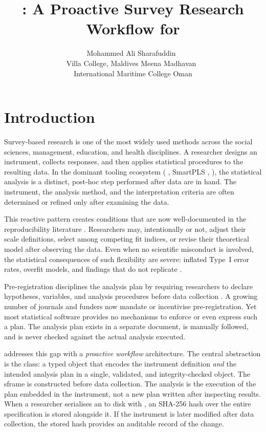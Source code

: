 \documentclass[article]{jss}\usepackage[]{graphicx}\usepackage[]{xcolor}
\author{Mohammed Ali Sharafuddin~\orcidlink{0000-0001-5247-2964}\\Villa College, Maldives
   \And Meena Madhavan~\orcidlink{0000-0003-1244-5392}\\International Maritime College Oman}
\title{\pkg{surveyframe}: A Proactive Survey Research Workflow for \proglang{R}}
\begin{document}



\section{Introduction}
\label{sec:intro}

Survey-based research is one of the most widely used methods across
the social sciences, management, education, and health disciplines.
A researcher designs an instrument, collects responses, and then
applies statistical procedures to the resulting data. In the dominant
tooling ecosystem ( \citep{ibm2023}, SmartPLS
\citep{ringleetal2022},  \citep{rosseel2012}), the
statistical analysis is a distinct, post-hoc step performed after data
are in hand. The instrument, the analysis method, and the interpretation
criteria are often determined or refined only after examining the data.

This reactive pattern creates conditions that are now well-documented
in the reproducibility literature \citep{simmons2011, open2015}.
Researchers may, intentionally or not, adjust their scale definitions,
select among competing fit indices, or revise their theoretical model
after observing the data. Even when no scientific misconduct is
involved, the statistical consequences of such flexibility are severe:
inflated Type~I error rates, overfit models, and findings that do not
replicate \citep{gelman2014}.

Pre-registration disciplines the analysis plan by requiring researchers
to declare hypotheses, variables, and analysis procedures before data
collection \citep{nosek2018}. A growing number of journals and funders
now mandate or incentivise pre-registration. Yet most statistical
software provides no mechanisms to enforce or even express such a plan.
The analysis plan exists in a separate document, is manually followed,
and is never checked against the actual analysis executed.

 addresses this gap with a \emph{proactive workflow}
architecture. The central abstraction is the  class: a
typed  object that encodes the instrument definition
\emph{and} the intended analysis plan in a single, validated, and
integrity-checked object. The sframe is constructed before data
collection. The analysis is the execution of the plan embedded in the
instrument, not a new plan written after inspecting results. When a
researcher serialises an  to disk with ,
an SHA-256 hash over the entire specification is stored alongside it.
If the instrument is later modified after data collection, the stored
hash provides an auditable record of the change.
\end{document}
